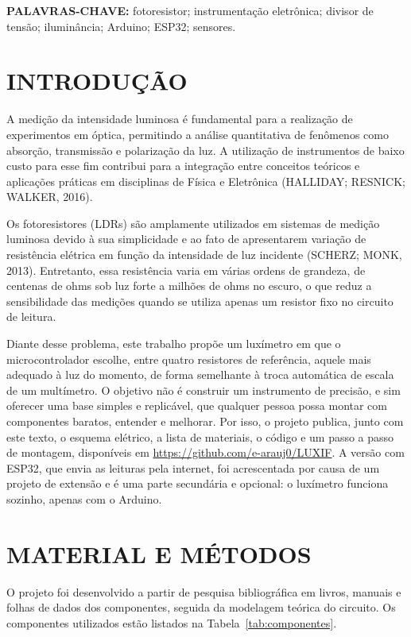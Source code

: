 \documentclass[11pt,a4paper]{article}
\begin{document}
\vspace{4pt}
\noindent\textbf{PALAVRAS-CHAVE:} fotoresistor; instrumentação eletrônica; divisor de tensão; iluminância; Arduino; ESP32; sensores.

\section*{INTRODUÇÃO}

A medição da intensidade luminosa é fundamental para a realização de experimentos em óptica, permitindo a análise quantitativa de fenômenos como absorção, transmissão e polarização da luz. A utilização de instrumentos de baixo custo para esse fim contribui para a integração entre conceitos teóricos e aplicações práticas em disciplinas de Física e Eletrônica (HALLIDAY; RESNICK; WALKER, 2016).

Os fotoresistores (LDRs) são amplamente utilizados em sistemas de medição luminosa devido à sua simplicidade e ao fato de apresentarem variação de resistência elétrica em função da intensidade de luz incidente (SCHERZ; MONK, 2013). Entretanto, essa resistência varia em várias ordens de grandeza, de centenas de ohms sob luz forte a milhões de ohms no escuro, o que reduz a sensibilidade das medições quando se utiliza apenas um resistor fixo no circuito de leitura.

Diante desse problema, este trabalho propõe um luxímetro em que o microcontrolador escolhe, entre quatro resistores de referência, aquele mais adequado à luz do momento, de forma semelhante à troca automática de escala de um multímetro. O objetivo não é construir um instrumento de precisão, e sim oferecer uma base simples e replicável, que qualquer pessoa possa montar com componentes baratos, entender e melhorar. Por isso, o projeto publica, junto com este texto, o esquema elétrico, a lista de materiais, o código e um passo a passo de montagem, disponíveis em \url{https://github.com/e-arauj0/LUXIF}. A versão com ESP32, que envia as leituras pela internet, foi acrescentada por causa de um projeto de extensão e é uma parte secundária e opcional: o luxímetro funciona sozinho, apenas com o Arduino.

\section*{MATERIAL E MÉTODOS}

O projeto foi desenvolvido a partir de pesquisa bibliográfica em livros, manuais e folhas de dados dos componentes, seguida da modelagem teórica do circuito. Os componentes utilizados estão listados na Tabela~\ref{tab:componentes}.
\end{document}
